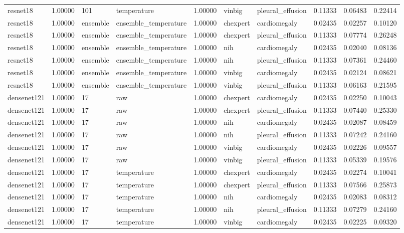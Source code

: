\begin{tabular}{lrllrllrrr}
resnet18 & 1.00000 & 101 & temperature & 1.00000 & vinbig & pleural\_effusion & 0.11333 & 0.06483 & 0.22414 \\
resnet18 & 1.00000 & ensemble & ensemble\_temperature & 1.00000 & chexpert & cardiomegaly & 0.02435 & 0.02257 & 0.10120 \\
resnet18 & 1.00000 & ensemble & ensemble\_temperature & 1.00000 & chexpert & pleural\_effusion & 0.11333 & 0.07774 & 0.26248 \\
resnet18 & 1.00000 & ensemble & ensemble\_temperature & 1.00000 & nih & cardiomegaly & 0.02435 & 0.02040 & 0.08136 \\
resnet18 & 1.00000 & ensemble & ensemble\_temperature & 1.00000 & nih & pleural\_effusion & 0.11333 & 0.07361 & 0.24460 \\
resnet18 & 1.00000 & ensemble & ensemble\_temperature & 1.00000 & vinbig & cardiomegaly & 0.02435 & 0.02124 & 0.08621 \\
resnet18 & 1.00000 & ensemble & ensemble\_temperature & 1.00000 & vinbig & pleural\_effusion & 0.11333 & 0.06163 & 0.21595 \\
densenet121 & 1.00000 & 17 & raw & 1.00000 & chexpert & cardiomegaly & 0.02435 & 0.02250 & 0.10043 \\
densenet121 & 1.00000 & 17 & raw & 1.00000 & chexpert & pleural\_effusion & 0.11333 & 0.07440 & 0.25330 \\
densenet121 & 1.00000 & 17 & raw & 1.00000 & nih & cardiomegaly & 0.02435 & 0.02087 & 0.08459 \\
densenet121 & 1.00000 & 17 & raw & 1.00000 & nih & pleural\_effusion & 0.11333 & 0.07242 & 0.24160 \\
densenet121 & 1.00000 & 17 & raw & 1.00000 & vinbig & cardiomegaly & 0.02435 & 0.02226 & 0.09557 \\
densenet121 & 1.00000 & 17 & raw & 1.00000 & vinbig & pleural\_effusion & 0.11333 & 0.05339 & 0.19576 \\
densenet121 & 1.00000 & 17 & temperature & 1.00000 & chexpert & cardiomegaly & 0.02435 & 0.02274 & 0.10041 \\
densenet121 & 1.00000 & 17 & temperature & 1.00000 & chexpert & pleural\_effusion & 0.11333 & 0.07566 & 0.25873 \\
densenet121 & 1.00000 & 17 & temperature & 1.00000 & nih & cardiomegaly & 0.02435 & 0.02083 & 0.08312 \\
densenet121 & 1.00000 & 17 & temperature & 1.00000 & nih & pleural\_effusion & 0.11333 & 0.07279 & 0.24160 \\
densenet121 & 1.00000 & 17 & temperature & 1.00000 & vinbig & cardiomegaly & 0.02435 & 0.02225 & 0.09320 \\

\end{tabular}
